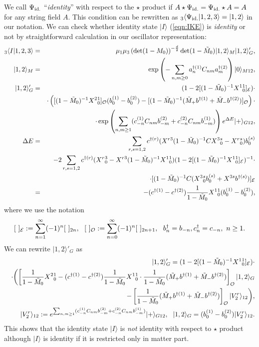 \documentclass[12pt,a4paper]{article}
\def\M0{{\tilde M}_0}
\def\Mp{{\tilde M}_+}
\def\Mm{{\tilde M}_-}
\begin{document}
We call $\Psi_{\rm id.}$ ``{\it identity}''  with respect to the $\star$ product if $A\star\Psi_{\rm id.}=\Psi_{\rm id.}\star A=A$ for any string field $A$. This condition can be rewritten as ${}_3\langle\Psi_{\rm id.}|1,2,3\rangle=|1,2\rangle$ in our notation.
We can check whether identity state $|I\rangle$ (\ref{eqn:IKE}) is {\it identity}  or not by straightforward calculation in our oscillator representation:
\begin{eqnarray}
\label{eqn:IV2I}
{}_3\langle I|1,2,3\rangle&=&\mu_1\mu_3\left(\det(1-M_0)\right)^{-{d\over2}}\det(1-{\tilde M}_0)|1,2\rangle_M |1,2\rangle'_G, \nonumber \\
|1,2\rangle_M &=& \exp\left(-\sum_{n,m\geq0}a^{\dagger(1)}_nC_{nm}a^{\dagger(2)}_m\right)|0\rangle_{M12}, \nonumber \\
|1,2\rangle'_G&=&(1-2[(1-{\tilde M}_0)^{-1}X^1{}^1_0]_{\cal E})\cdot \nonumber \\
&&\cdot \left([(1-{\tilde M}_0)^{-1}{X^2}{}^1_0]_{\cal O}(b^{(1)}_0-b^{(2)}_0)-[(1-{\tilde M}_0)^{-1}({\tilde M}_+ b^{\dagger(1)}+{\tilde M}_- b^{\dagger(2)})]_{\cal O}\right) \cdot \nonumber \\
&&\cdot \exp\left(\sum_{n,m\geq1}(c^{(1)}_{-n}C_{nm}b^{(2)}_{-m}+c^{(2)}_{-n}C_{nm}b^{(1)}_{-m})\right)e^{\Delta E}|+\rangle_{G12},\nonumber \\
\Delta E&=&\sum_{r,s=1,2}c^{\dagger(r)}(X^{r3}(1-{\tilde M}_0)^{-1} CX^3{}^s_0-X^r{}^s_0)b^{(s)}_0\nonumber \\
&&-2\sum_{r,s=1,2}c^{\dagger(r)}(X^r{}^3_0 -X^{r3}(1-{\tilde M}_0)^{-1}X^1{}^1_0)(1-2[(1-{\tilde M}_0)^{-1}X^1{}^1_0]_{\cal E})^{-1}\cdot \nonumber \\
&&\cdot [(1-{\tilde M}_0)^{-1}C(X^3{}^s_0b^{(s)}_0+X^{3s}b^{\dagger(s)})]_{\cal E} \nonumber \\
&=&-(c^{\dagger(1)}-c^{\dagger(2)}){1\over1-\M0 }X^1{}^1_0(b^{(1)}_0-b^{(2)}_0),
\end{eqnarray}
where we use the notation
\begin{equation}
\label{eqn:OESUM}
[\ ]_{\cal E}:=\sum_{n=1}^\infty(-1)^n[\ ]_{2n},\ \ [\ ]_{\cal O}:=\sum_{n=0}^\infty(-1)^n[\ ]_{2n+1},\ \ b^\dagger_n=b_{-n},c^\dagger_n=c_{-n},\ n\geq1.
\end{equation}
We can rewrite $|1,2\rangle'_G$ as
\begin{eqnarray}
\label{eqn:IGP}
&&|1,2\rangle'_G=(1-2[(1-{\tilde M}_0)^{-1}X^1{}^1_0]_{\cal E})\cdot \nonumber \\
&&\cdot \biggl(\left[{1\over 1-{\tilde M}_0}{X^2}{}^1_0-(c^{\dagger(1)}-c^{\dagger(2)}){1\over1-\M0 }X^1{}^1_0\cdot {1\over1-\M0}(\Mp b^{\dagger(1)}+\Mm b^{\dagger(2)})\right]_{\cal O}|1,2\rangle_G\nonumber \\
&&- \left[{1\over1-\M0 }(\Mp b^{\dagger(1)}+\Mm b^{\dagger(2)})\right]_{\cal O}|V_2^r\rangle_{12}\biggr),\nonumber \\
&&|V^r_2\rangle_{12}:=e^{\sum_{n,m\geq1}(c^{(1)}_{-n}C_{nm}b^{(2)}_{-m}+c^{(2)}_{-n}C_{nm}b^{(1)}_{-m})}|+\rangle_{G12},\ \ |1,2\rangle_G=(b^{(1)}_0-b^{(2)}_0)|V_2^r\rangle_{12}.
\end{eqnarray}
This shows that the identity state $|I\rangle$ is {\it not} identity with respect to $\star$ product although $|I\rangle$ is identity if it is restricted only in matter part.
\end{document}
